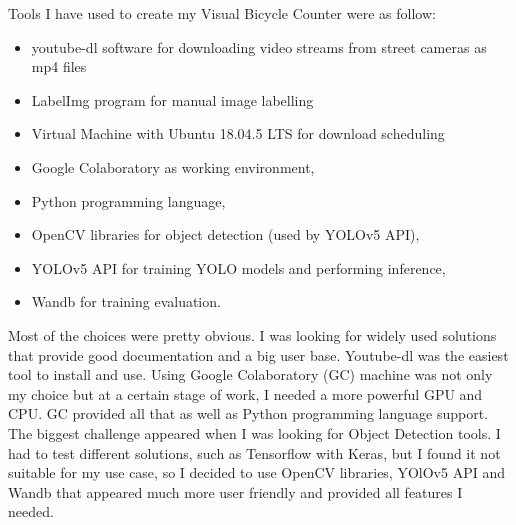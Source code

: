 Tools I have used to create my Visual Bicycle Counter were as follow:
\begin{itemize}
    \item youtube-dl software for downloading video streams from street cameras as mp4 files
    \item LabelImg program for manual image labelling 
    \item Virtual Machine with Ubuntu 18.04.5 LTS for download scheduling 
    \item Google Colaboratory as working environment,
    \item Python programming language,
    \item OpenCV libraries for object detection (used by YOLOv5 API),
    \item YOLOv5 API for training YOLO\cite{Redmon_2016_CVPR} models and performing inference,
    \item Wandb for training evaluation.
\end{itemize}
Most of the choices were pretty obvious. I was looking for widely used solutions that provide good documentation and a big user base. Youtube-dl was the easiest tool to install and use. Using Google Colaboratory (GC) machine was not only my choice but at a certain stage of work, I needed a more powerful GPU and CPU. GC provided all that as well as Python programming language support. The biggest challenge appeared when I was looking for Object Detection tools. I had to test different solutions, such as Tensorflow with Keras, but I found it not suitable for my use case, so I decided to use OpenCV libraries, YOlOv5 API and Wandb that appeared much more user friendly and provided all features I needed.

